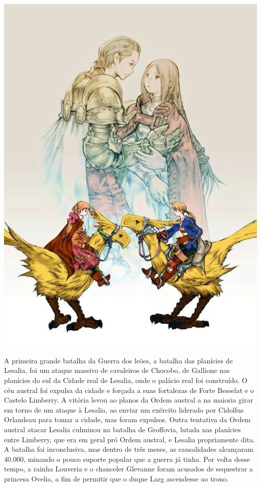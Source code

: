 \includegraphics[width=\columnwidth]{./art/worldbook/cover.jpg}
\ofpar
%
A primeira grande batalha da Guerra dos leões, a batalha das planícies de Lesalia, foi um ataque massivo de cavaleiros de Chocobo, de Gallione nas planícies do sul da Cidade real de Lesalia, onde o palácio real foi construído.
O céu austral foi expulsa da cidade e forçada a suas fortalezas de Forte Besselat e o Castelo Limberry.
A vitória levou ao planos da Ordem austral a na maioria girar em torno de um ataque à Lesalia, ao enviar um exército liderado por Cidolfus Orlandeau para tomar a cidade, mas foram expulsos.
Outra tentativa da Ordem austral atacar Lesalia culminou na batalha de Groffovia, lutada nas planícies entre Limberry, que era em geral pró Ordem austral, e Lesalia propriamente dita.
A batalha foi inconclusiva, mas dentro de três meses, as causalidades alcançaram 40.000, minando o pouco suporte popular que a guerra já tinha.
Por volta desse tempo, a rainha Louveria e o chanceler Glevanne foram acusados de sequestrar a princesa Ovelia, a fim de permitir que o duque Larg ascendesse ao trono.

